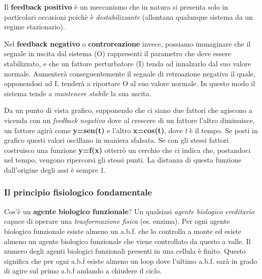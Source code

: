 \documentclass[]{article}
\begin{document}
Il \textbf{feedback positivo} è un meccanismo che in natura si presenta
solo in particolari occasioni poichè è \emph{destabilizzante} (allontana
qualunque sistema da un regime stazionario).

Nel \textbf{feedback negativo} o \textbf{controreazione} invece,
possiamo immaginare che il segnale in uscita dal sistema (O) rappresenti
il parametro che deve essere stabilizzato, e che un fattore perturbatore
(I) tenda ad innalzarlo dal suo valore normale. Aumenterà
conseguentemente il segnale di retroazione negativa il quale,
opponendosi ad I, tenderà a riportare O al suo valore normale. In questo
modo il sistema tende a \emph{mantenere stabile} la sua uscita.

Da un punto di vista grafico, supponendo che ci siano due fattori che
agiscono a vicenda con un \emph{feedback negativo} dove al crescere di
un fattore l'altro diminuisce, un fattore agirà come \textbf{y=sen(t)} e
l'altro \textbf{x=cos(t)}, dove \emph{t} è il tempo. Se posti in grafico
questi valori oscillano in maniera sfalsata. Se con gli stessi fattori
costruisco una funzione \textbf{y=f(x)} otterrò un cerchio che ci indica
che, postandoci nel tempo, vengono ripercorsi gli stessi punti. La
distanza di questa funzione dall'origine degli assi è sempre 1.

\subsubsection{Il principio fisiologico
fondamentale}\label{il-principio-fisiologico-fondamentale}

Cos'è un \textbf{agente biologico funzionale}? Un qualsiasi \emph{agente
biologico ereditario} capace di operare una \emph{trasformazione fisica}
(es. enzima). Per ogni agente biologico funzionale esiste almeno un
a.b.f. che lo controlla a monte ed esiste almeno un agente biologico
funzionale che viene controllato da questo a valle. Il numero degli
agenti biologici funzionali presenti in una cellula è finito. Questo
significa che per ogni a.b.f esiste almeno un loop dove l'ultimo a.b.f.
sarà in grado di agire sul primo a.b.f andando a chiudere il ciclo.
\end{document}
